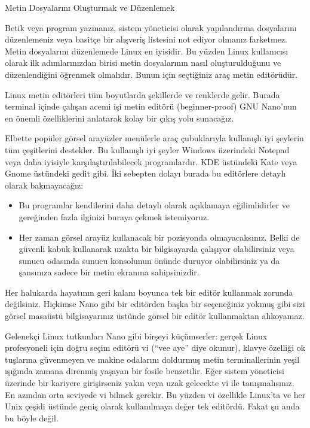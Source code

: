\begin{section}{Metin Dosyalarını Oluşturmak ve Düzenlemek}

Betik veya program yazmanız, sistem yöneticisi olarak yapılandırma dosyalarını düzenlemeniz veya basitçe bir alışveriş listesini not ediyor olmanız farketmez. Metin dosyalarını düzenlemede Linux en iyisidir. Bu yüzden Linux kullanıcısı olarak ilk adımlarınızdan birisi metin dosyalarının nasıl oluşturulduğunu ve düzenlendiğini öğrenmek olmalıdır. Bunun için seçtiğiniz araç metin editörüdür. 

Linux metin editörleri tüm boyutlarda şekillerde ve renklerde gelir. Burada terminal içinde çalışan acemi işi metin editörü (beginner-proof) GNU Nano’nun en önemli özelliklerini anlatarak kolay bir çıkış yolu sunacağız.

Elbette popüler görsel arayüzler menülerle araç çubuklarıyla kullanışlı iyi şeylerin tüm çeşitlerini destekler.  Bu kullanışlı iyi şeyler Windows üzerindeki Notepad veya daha iyisiyle karşılaştırılabilecek programlardır. KDE üstündeki Kate veya Gnome üstündeki gedit gibi. İki sebepten dolayı  burada bu editörlere detaylı olarak bakmayacağız:

\begin{itemize}
\item Bu programlar kendilerini daha detaylı olarak açıklamaya eğilimlidirler ve gereğinden fazla ilginizi buraya çekmek istemiyoruz. 
\item Her zaman görsel arayüz kullanacak bir pozisyonda olmayacaksınız. Belki de güvenli kabuk kullanarak uzakta bir bilgisayarda çalışıyor olabilirsiniz veya sunucu odasında sunucu konsolunun önünde duruyor olabilirsiniz ya da şansınıza sadece bir metin ekranına sahipsinizdir. 
\end{itemize}

Her halukarda hayatının geri kalanı boyunca tek bir editör kullanmak zorunda değilsiniz. Hiçkimse Nano gibi bir editörden başka bir seçeneğiniz yokmuş gibi sizi görsel masaüstü bilgisayarınız üstünde görsel bir editör kullanmaktan alıkoyamaz.
 
Gelenekçi Linux tutkunları Nano gibi birşeyi küçümserler: gerçek Linux profesyoneli için doğru seçim editörü vi (“vee aye” diye okunur), klavye özelliği ok tuşlarına güvenmeyen ve makine odalarını doldurmuş metin terminallerinin yeşil ışığında zamana direnmiş yaşayan bir fosile benzetilir. Eğer sistem yöneticisi üzerinde bir kariyere girişirseniz yakın veya uzak gelecekte vi ile tanışmalısınız. En azından orta seviyede vi bilmek gerekir. Bu yüzden vi özellikle Linux’ta ve her Unix çeşidi üstünde geniş olarak kullanılmaya değer tek editördü. Fakat şu anda bu böyle değil. 


\end{section}
